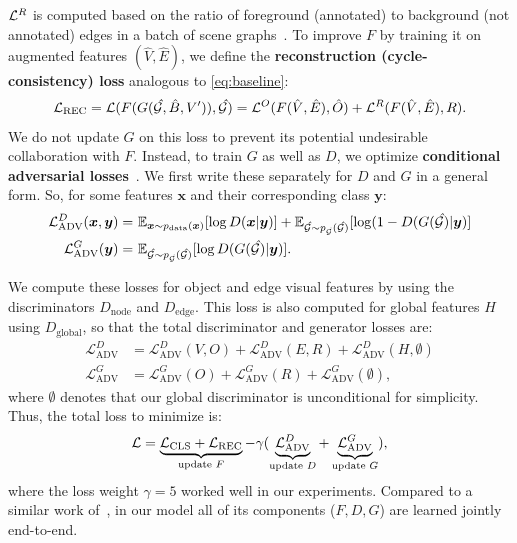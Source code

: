 ${\cal L}^{R}$ is computed based on the ratio of foreground (annotated) to background (not annotated) edges in a batch of scene graphs~\citep{knyazev2020graph}.
To improve $F$ by training it on augmented features $(\hat{V}, \hat{E})$, we define the \textbf{reconstruction (cycle-consistency) loss} analogous to \eqref{eq:baseline}:
%
\begin{align}
\label{eq:rec}
{\cal L}_\text{REC} = {\cal L}(F(G(\mathit{\hat{\mathit{\cal G}}}, \hat{B}, V^\prime)), {\mathit{\hat{\mathit{\cal G}}}}) = {\cal L}^{O}(F( \hat{V}, \hat{E}), \hat{O}) + {\cal L}^{R}(F( \hat{V}, \hat{E} ), R).
\end{align}
%
We do not update $G$ on this loss to prevent its potential undesirable collaboration with $F$.
Instead, to train $G$ as well as $D$, we optimize \textbf{conditional adversarial losses}~\citep{mirza2014conditional}.
We first write these separately for $D$ and $G$ in a general form.
So, for some features $\bm{x}$ and their corresponding class $\bm{y}$:
%
\begin{align}
\label{eq:adv_D}
\mathcal{L}^D_{\text{ADV}}(\bm{x}, \bm{y}) =& \ \mathbb{E}_{\bm{x} \sim p_{\text{data}}(\bm{x})}[\log D(\bm{x}|\bm{y})] + \mathbb{E}_{\mathit{\hat{\mathit{\cal G}}} \sim p_{\mathit{\hat{\mathit{\cal G}}}}(\mathit{\hat{\mathit{\cal G}}})}[\log (1-D(G(\mathit{\hat{\mathit{\cal G}}})|\bm{y})] \\
\mathcal{L}^G_{\text{ADV}}(\bm{y}) =& \ \mathbb{E}_{\mathit{\hat{\mathit{\cal G}}} \sim p_{\mathit{\hat{\mathit{\cal G}}}}(\mathit{\hat{\mathit{\cal G}}})}[\log D(G(\mathit{\hat{\mathit{\cal G}}})| \bm{y}) ] .\
\end{align}
%

We compute these losses for object and edge visual features by using the discriminators $D_{\text{node}}$ and  $D_{\text{edge}}$. This loss is also computed for global features $H$ using $D_{\text{global}}$, so that the total discriminator and generator losses are:
%
\begin{align}
\label{eq:adv_full}
\mathcal{L}^D_{\text{ADV}} &= \mathcal{L}^D_{\text{ADV}}(V,O) + \mathcal{L}^D_{\text{ADV}}(E,R) + \mathcal{L}^D_{\text{ADV}}(H,\emptyset) \nonumber \\
\mathcal{L}^G_{\text{ADV}} &= \mathcal{L}^G_{\text{ADV}}(O) + \mathcal{L}^G_{\text{ADV}}(R) + \mathcal{L}^G_{\text{ADV}}(\emptyset),
\end{align}
%
\noindent where $\emptyset$ denotes that our global discriminator is unconditional for simplicity.
Thus, the total loss to minimize is:
\vspace{-5pt}
\begin{align}
\label{eq:total_loss}
\mathcal{L} = \underbrace{{\cal L}_{\text{CLS}}  + {\cal L}_{\text{REC}}}_{\text{update } F} - \gamma(\underbrace{\mathcal{L}^D_{\text{ADV}}}_{\text{update } D} + \underbrace{\mathcal{L}^G_{\text{ADV}}}_{\text{update } G}),
\end{align}
%
\noindent where the loss weight $\gamma=5$ worked well in our experiments.
Compared to a similar work of~\citep{wang2019generating}, in our model all of its components ($F,D,G$) are learned jointly end-to-end. 


